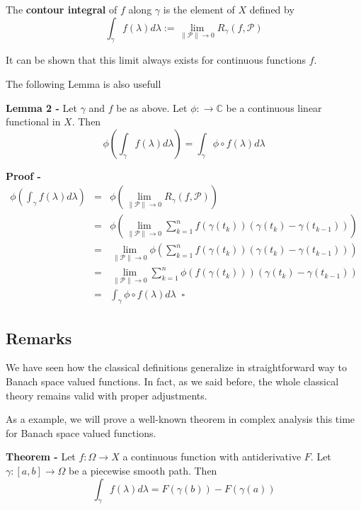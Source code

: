 \documentclass[12pt]{article}
\begin{document}
The {\bf contour integral} of $f$ along $\gamma$ is the element of $X$ defined by
\begin{displaymath}
\int_{\gamma} f(\lambda) d\lambda := \lim_{\|\mathcal{P}\| \rightarrow 0} R_{\gamma}(f,\mathcal{P})
\end{displaymath}

It can be shown that this limit always exists for continuous functions $f$.

The following Lemma is also usefull 

{\bf Lemma 2 -} Let $\gamma$ and $f$ be as above. Let $\phi :  \longrightarrow \mathbb{C}$ be a continuous linear functional in $X$. Then
\begin{displaymath}
\phi \left(\int_{\gamma} f(\lambda) d\lambda \right) = \int_{\gamma} \phi \circ f (\lambda) d\lambda
\end{displaymath}

{\bf Proof -}
\begin{eqnarray*}
\phi \left(\int_{\gamma} f(\lambda) d\lambda \right) & = & \phi \left(\lim_{\|\mathcal{P}\| \rightarrow 0} R_{\gamma}(f,\mathcal{P})\right) \\
& = & \phi \left(\lim_{\|\mathcal{P}\| \rightarrow 0} \sum_{k=1}^n f(\gamma(t_k))(\gamma(t_k)-\gamma(t_{k-1})) \right) \\
& = & \lim_{\|\mathcal{P}\| \rightarrow 0} \phi \left(\sum_{k=1}^n f(\gamma(t_k))(\gamma(t_k)-\gamma(t_{k-1}))\right) \\
& = & \lim_{\|\mathcal{P}\| \rightarrow 0} \sum_{k=1}^n \phi(f(\gamma(t_k)))(\gamma(t_k)-\gamma(t_{k-1})) \\
& = & \int_{\gamma} \phi \circ f(\lambda) d\lambda \;\;\square
\end{eqnarray*}

\subsection{Remarks}

We have seen how the classical definitions generalize in straightforward way to Banach space valued functions. In fact, as we said before, the whole classical theory remains valid with proper adjustments.

As a  example, we will prove a well-known theorem in complex analysis this time for Banach space valued functions.

{\bf Theorem -} Let $f: \Omega \longrightarrow X$ a continuous function with antiderivative $F$. Let $\gamma : [a,b] \longrightarrow \Omega$ be a piecewise smooth path. Then
\begin{displaymath}
\int_{\gamma} f(\lambda) d\lambda = F(\gamma(b)) - F(\gamma(a))
\end{displaymath}
\end{document}
